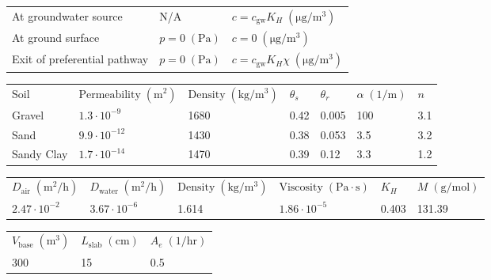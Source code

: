 \documentclass[journal=esthag,manuscript=article]{achemso}
\begin{document}
\begin{table}[htb!]
\begin{tabular}{l l l}
    At groundwater source &  N/A & $c = c_\mathrm{gw} K_H \; \mathrm{(\mu g/m^3)}$ \\
    At ground surface      & $p = 0 \; \mathrm{(Pa)}$  & $c = 0 \; \mathrm{(\mu g/m^3)}$ \\
    Exit of preferential pathway  & $p = 0 \; \mathrm{(Pa)}$  & $c = c_\mathrm{gw} K_H \chi \; \mathrm{(\mu g/m^3)}$ \\
    \bottomrule
  \end{tabular}
  \bigskip
  \begin{tabular}{l l l l l l l}
    \toprule
    Soil & $\text{Permeability} \; \mathrm{(m^2)}$  & $\mathrm{Density} \; \mathrm{(kg/m^3)}$  & $\theta_s$  & $\theta_r$  & $\alpha \; \mathrm{(1/m)}$  & $n$ \\
    Gravel     & $1.3 \cdot 10^{-9}$   & 1680    & 0.42        & 0.005       & 100       & 3.1 \\
    Sand     & $9.9 \cdot 10^{-12}$  & 1430    & 0.38        & 0.053        & 3.5       & 3.2 \\
    Sandy Clay    & $1.7 \cdot 10^{-14}$  & 1470    & 0.39        & 0.12        & 3.3       & 1.2 \\
    \bottomrule
  \end{tabular}
  \bigskip
  \begin{tabular}{l l l l l l}
    \toprule
    $D_\mathrm{air} \; \mathrm{(m^2/h)}$  & $D_\mathrm{water} \; \mathrm{(m^2/h)}$  & $\mathrm{Density} \; \mathrm{(kg/m^3)}$ & $\mathrm{Viscosity} \; \mathrm{(Pa \cdot s)}$  & $K_H$ & $M \; \mathrm{(g/mol)}$ \\
    $2.47 \cdot 10^{-2}$  & $3.67 \cdot 10^{-6}$  & 1.614 & $1.86 \cdot 10^{-5}$  & 0.403 & 131.39 \\
    \bottomrule
  \end{tabular}
  \bigskip
  \begin{tabular}{l l l}
    \toprule
    $V_\mathrm{base} \; \mathrm{(m^3)}$  & $L_\mathrm{slab} \; \mathrm{(cm)}$  & $A_e \; \mathrm{(1/hr)}$ \\
    300  &  15  & 0.5 \\
    \bottomrule
  \end{tabular}
\end{table}
\end{document}
